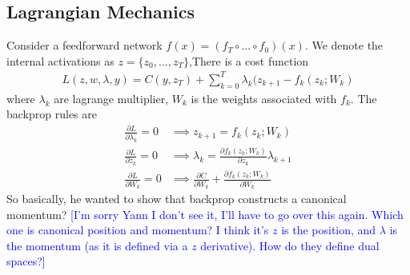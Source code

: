 \subsection{Lagrangian Mechanics}
Consider a feedforward network $f(x) = (f_T \circ ... \circ f_0)(x)$. We denote the internal activations as $z = \{z_0, ..., z_T\}$,There is a cost function
\begin{align}
	L(z,w,\lambda, y) = C(y, z_T) + \sum_{k=0}^T
 \lambda_k (z_{k+1} - f_k(z_k; W_k)\end{align}
where $\lambda_k$ are lagrange multiplier, $W_k$ is the weights associated with $f_k$. The backprop rules are
\begin{align}
	\frac{\partial L}{\partial \lambda_k} = 0 & \implies z_{k+1} = f_k(z_k; W_k)\\
	\frac{\partial L}{\partial z_k} = 0 & \implies \lambda_k  = \frac{\partial f_k(z_k; W_k)}{\partial z_k} \lambda_{k+1}\\
	\frac{\partial L}{\partial W_k}= 0 & \implies \frac{\partial C}{\partial W_k} +  \frac{\partial f_k (z_k; W_k)}{\partial W_k} \
\end{align}
So basically, he wanted to show that backprop constructs a canonical momentum? \textcolor{blue}{[I'm sorry Yann I don't see it, I'll have to go over this again. Which one is canonical position and momentum? I think it's $z$ is the position, and $\lambda$ is the momentum (as it is defined via a $z$ derivative). How do they define dual spaces?]}
